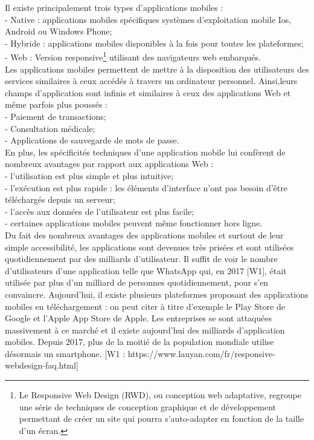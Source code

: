 Il existe principalement trois types d'applications mobiles :\\
- Native : applications mobiles spécifiques systèmes d'exploitation mobile Ios, Android ou Windows Phone;\\
- Hybride : applications mobiles disponibles à la fois pour toutes les plateformes;\\
- Web : Version responsive\footnote{Le Responsive Web Design (RWD), ou conception web adaptative, regroupe une série de techniques de conception graphique et de développement permettant de créer un site qui pourra s'auto-adapter en fonction de la taille d'un écran.} utilisant des navigateurs web embarqués.\\
Les applications mobiles permettent de mettre à la disposition des utilisateurs des services similaires à ceux accédés à travers un ordinateur personnel. Ainsi,leurs champs d'application sont infinis et similaires à ceux des applications Web et même parfois plus poussés :\\
- Paiement de transactions;\\
- Consultation médicale;\\
- Applications de sauvegarde de mots de passe.\\
En plus, les spécificités techniques d’une application mobile lui confèrent de nombreux avantages par rapport aux applications Web :\\
- l'utilisation est plus simple et plus intuitive; \\
- l’exécution est plus rapide : les éléments d’interface n’ont pas besoin d’être téléchargés depuis un serveur; \\
- l’accès aux données de l’utilisateur est plus facile; \\
- certaines applications mobiles peuvent même fonctionner hors ligne.\\
Du fait des nombreux avantages des applications mobiles et surtout de leur simple accessibilité, les applications sont devenues très prisées et sont utilisées quotidiennement par des milliards d'utilisateur. Il suffit de voir le nombre d'utilisateurs d'une application telle que WhatsApp qui, en 2017 [W1], était utilisée par plus d'un milliard de personnes quotidiennement, pour s'en convaincre. Aujourd'hui, il existe plusieurs plateformes proposant des applications mobiles en téléchargement : on peut citer à titre d'exemple le Play Store de Google et l'Apple App Store de Apple. Les entreprises se sont attaquées massivement à ce marché et il existe aujourd'hui des milliards d'application mobiles. Depuis 2017, plus de la moitié de la population mondiale utilise désormais un smartphone. [W1 : https://www.lauyan.com/fr/responsive-webdesign-faq.html]
